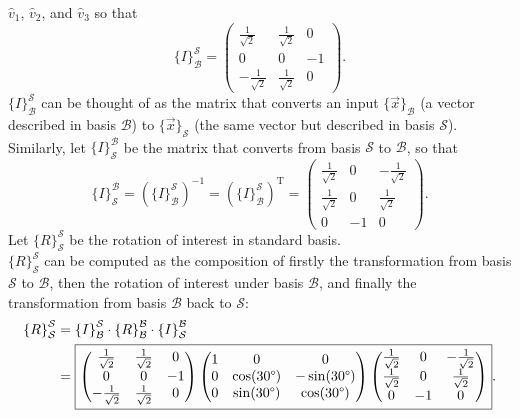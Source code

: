 \documentclass[12pt]{article}
\begin{document}
$\hat{v}_1$, $\hat{v}_2$, and $\hat{v}_3$ so that
\begin{equation*}
	{\{I\}}_{\mathcal{B}}^{\mathcal{S}}
	=
	\begin{pmatrix}
		\frac{1}{\sqrt{2}} & \frac{1}{\sqrt{2}} & 0 \\
		0 & 0 & -1 \\
		-\frac{1}{\sqrt{2}} & \frac{1}{\sqrt{2}} & 0
	\end{pmatrix}
	.
\end{equation*}
${\{I\}}_{\mathcal{B}}^{\mathcal{S}}$ can be thought of as the matrix that
converts an input ${\{\vec{x}\}}_{\mathcal{B}}$ (a vector described in basis
$\mathcal{B}$) to ${\{\vec{x}\}}_{\mathcal{S}}$ (the same vector but
described in basis $\mathcal{S}$). \\
Similarly, let ${\{I\}}_{\mathcal{S}}^{\mathcal{B}}$ be the matrix that
converts from basis $\mathcal{S}$ to $\mathcal{B}$, so that
\begin{equation*}
	{\{I\}}_{\mathcal{S}}^{\mathcal{B}}
	=
	{\left( {\{I\}}_{\mathcal{B}}^{\mathcal{S}} \right)}^{-1}
	=
	{\left( {\{I\}}_{\mathcal{B}}^{\mathcal{S}} \right)}^{\text{T}}
	=
	\begin{pmatrix}
		\frac{1}{\sqrt{2}} & 0 & -\frac{1}{\sqrt{2}} \\
		\frac{1}{\sqrt{2}} & 0 & \frac{1}{\sqrt{2}} \\
		0 & -1 & 0
	\end{pmatrix}
	.
\end{equation*}
Let ${\{R\}}_{\mathcal{S}}^{\mathcal{S}}$ be the rotation of interest in
standard basis. \\
${\{R\}}_{\mathcal{S}}^{\mathcal{S}}$ can be computed as the composition of
firstly the transformation from basis $\mathcal{S}$ to $\mathcal{B}$, then the
rotation of interest under basis $\mathcal{B}$, and finally the transformation
from basis $\mathcal{B}$ back to $\mathcal{S}$:
\begin{align*}
	{\{R\}}_{\mathcal{S}}^{\mathcal{S}}
	&=
	{{\{I\}}_{\mathcal{B}}^{\mathcal{S}}}
	\cdot
	{{\{R\}}_{\mathcal{B}}^{\mathcal{B}}}
	\cdot
	{{\{I\}}_{\mathcal{S}}^{\mathcal{B}}}
	\\
	&=
	\boxed{
		\begin{pmatrix}
			\frac{1}{\sqrt{2}} & \frac{1}{\sqrt{2}} & 0 \\
			0 & 0 & -1 \\
			-\frac{1}{\sqrt{2}} & \frac{1}{\sqrt{2}} & 0
		\end{pmatrix}
		\begin{pmatrix}
			1 & 0 & 0 \\
			0 & \cos(30 \degree) & -\sin(30 \degree) \\
			0 & \sin(30 \degree) & \cos(30 \degree)
		\end{pmatrix}
		\begin{pmatrix}
			\frac{1}{\sqrt{2}} & 0 & -\frac{1}{\sqrt{2}} \\
			\frac{1}{\sqrt{2}} & 0 & \frac{1}{\sqrt{2}} \\
			0 & -1 & 0
		\end{pmatrix}
	}
	.
\end{align*}
\end{document}

